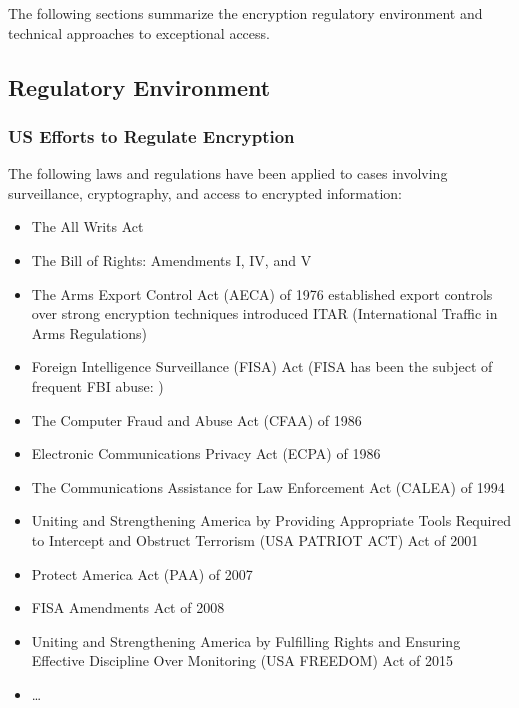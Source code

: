 
The following sections summarize the encryption regulatory environment and technical approaches to exceptional access.

\subsection{Regulatory Environment}
\label{sec-reg-environment}

\subsubsection*{US Efforts to Regulate Encryption}

The following laws and regulations have been applied to cases involving surveillance, cryptography, and access to
encrypted information:

\begin{itemize}
    \item The All Writs Act \cite{congress_1789}
    \item The Bill of Rights: Amendments I, IV, and V \cite{madison_1791}
    \item The Arms Export Control Act (AECA) of 1976 established export controls over strong encryption techniques
        introduced ITAR (International Traffic in Arms Regulations) \cite{morgan_hr13680_1976} \cite{kehl_right_2015}
    \item Foreign Intelligence Surveillance (FISA) Act \cite{rodino_1978}
        (FISA has been the subject of frequent FBI abuse: \cite{shamsi_2011} \cite{tucker_2020})
    \item The Computer Fraud and Abuse Act (CFAA) of 1986 \cite{hughes_hr4718_1986} \cite{wolff_computer_2016}
    \item Electronic Communications Privacy Act (ECPA) of 1986 \cite{kastenmeier_hr4952_1986}
    \item The Communications Assistance for Law Enforcement Act (CALEA) of 1994 \cite{edwards_hr4922_1994}
    \item Uniting and Strengthening America by Providing Appropriate Tools Required to Intercept and Obstruct Terrorism
        (USA PATRIOT ACT) Act of 2001 \cite{sensenbrenner_2001}
    \item Protect America Act (PAA) of 2007 \cite{mcconnell_s1927_2007}
    \item FISA Amendments Act of 2008 \cite{reyes_hr6304_2008}
    \item Uniting and Strengthening America by Fulfilling Rights and Ensuring Effective Discipline Over Monitoring
        (USA FREEDOM) Act of 2015 \cite{sensenbrenner_2015}
    \item \dots
\end{itemize}

